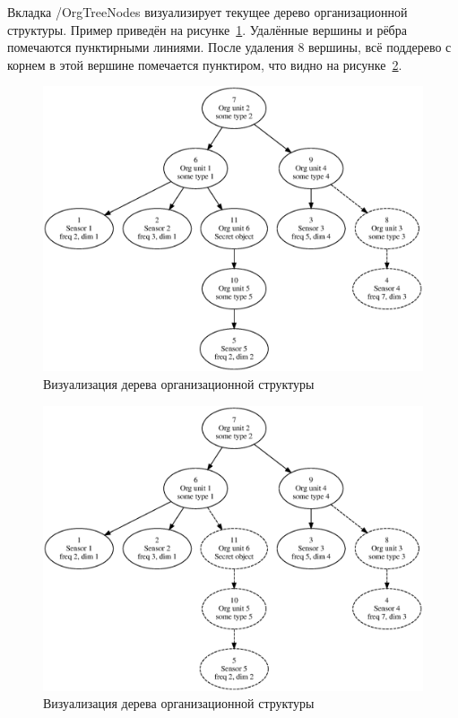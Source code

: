 Вкладка /OrgTreeNodes визуализирует текущее дерево организационной структуры. Пример приведён на рисунке~\ref{demo1}. Удалённые вершины и рёбра помечаются пунктирными линиями. После удаления $8$ вершины, всё поддерево с корнем в этой вершине помечается пунктиром, что видно на рисунке~\ref{demo2}.

\begin{figure}
    \includegraphics[scale=0.6]{img/demo_del8.eps}
    \caption{Визуализация дерева организационной структуры}
    \label{demo1}
\end{figure}

\begin{figure}
    \includegraphics[scale=0.6]{img/demo_del8,11.eps}
    \caption{Визуализация дерева организационной структуры}
    \label{demo2}
\end{figure}

